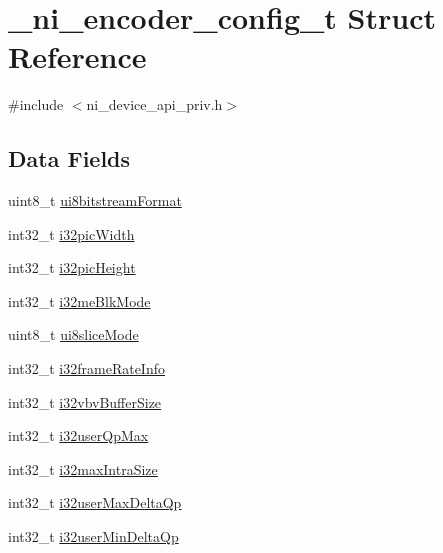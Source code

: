 \hypertarget{struct__ni__encoder__config__t}{}\section{\+\_\+ni\+\_\+encoder\+\_\+config\+\_\+t Struct Reference}
\label{struct__ni__encoder__config__t}


{\ttfamily \#include $<$ni\+\_\+device\+\_\+api\+\_\+priv.\+h$>$}

\subsection*{Data Fields}
\begin{DoxyCompactItemize}
\item 
uint8\+\_\+t \mbox{\hyperlink{struct__ni__encoder__config__t_aff5e012e1cbc8c42ca94222163a4de2c}{ui8bitstream\+Format}}
\item 
int32\+\_\+t \mbox{\hyperlink{struct__ni__encoder__config__t_a85f10b6b600cc11c8f957aa462c1b658}{i32pic\+Width}}
\item 
int32\+\_\+t \mbox{\hyperlink{struct__ni__encoder__config__t_a95322a823ea7810a23f556358f376c95}{i32pic\+Height}}
\item 
int32\+\_\+t \mbox{\hyperlink{struct__ni__encoder__config__t_a425b4405b9fb54c132b4c2f86d10c8d3}{i32me\+Blk\+Mode}}
\item 
uint8\+\_\+t \mbox{\hyperlink{struct__ni__encoder__config__t_a9db7241e83cbbfda6ac58cd37672190b}{ui8slice\+Mode}}
\item 
int32\+\_\+t \mbox{\hyperlink{struct__ni__encoder__config__t_ae79d748894b8280f85bedb2056df90ee}{i32frame\+Rate\+Info}}
\item 
int32\+\_\+t \mbox{\hyperlink{struct__ni__encoder__config__t_a8809f2a97609539b668988331b9fe6ba}{i32vbv\+Buffer\+Size}}
\item 
int32\+\_\+t \mbox{\hyperlink{struct__ni__encoder__config__t_a749afa769fcfcd4362cc1c241a7012b2}{i32user\+Qp\+Max}}
\item 
int32\+\_\+t \mbox{\hyperlink{struct__ni__encoder__config__t_a9fb452bb118457d20baddc626461e757}{i32max\+Intra\+Size}}
\item 
int32\+\_\+t \mbox{\hyperlink{struct__ni__encoder__config__t_a2c10f8526c8ba4f6cc94ea407fa9d661}{i32user\+Max\+Delta\+Qp}}
\item 
int32\+\_\+t \mbox{\hyperlink{struct__ni__encoder__config__t_a29255a6173ec5df2792c294169fe40c1}{i32user\+Min\+Delta\+Qp}}
\item 

\end{DoxyCompactItemize}
